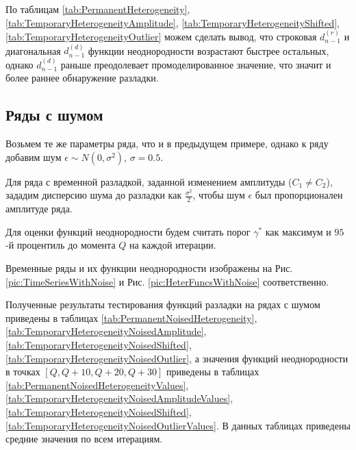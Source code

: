 \documentclass[specialist, substylefile = spbu.rtx,
			   subf, href, 12pt]{disser}
\begin{document}
По таблицам \ref{tab:PermanentHeterogeneity}, \ref{tab:TemporaryHeterogeneityAmplitude}, \ref{tab:TemporaryHeterogeneityShifted}, \ref{tab:TemporaryHeterogeneityOutlier} можем сделать вывод, что строковая $d_{n-1}^{(r)}$ и диагональная $d_{n-1}^{(d)}$ функции неоднородности возрастают быстрее остальных, однако $d_{n-1}^{(d)}$ раньше преодолевает промоделированное значение, что значит и более раннее обнаружение разладки.


\newpage
\subsection{Ряды с шумом}
Возьмем те же параметры ряда, что и в предыдущем примере, однако к ряду добавим шум $\epsilon \sim N(0, \sigma^2)$, $\sigma = 0.5$. 

Для ряда с временной разладкой, заданной изменением амплитуды ($C_1 \neq C_2$), зададим дисперсию шума до разладки как $\frac{\sigma^2}{2}$, чтобы шум $\epsilon$ был пропорционален амплитуде ряда. 

Для оценки функций неоднородности будем считать порог $ \gamma^* $ как максимум и $ 95 $-й процентиль до момента $ Q $ на каждой итерации.

Временные ряды и их функции неоднородности изображены на Рис. \ref{pic:TimeSeriesWithNoise} и Рис. \ref{pic:HeterFuncsWithNoise} соответственно.

Полученные результаты тестирования функций разладки на рядах с шумом приведены в таблицах \ref{tab:PermanentNoisedHeterogeneity}, \ref{tab:TemporaryHeterogeneityNoisedAmplitude}, \ref{tab:TemporaryHeterogeneityNoisedShifted}, \ref{tab:TemporaryHeterogeneityNoisedOutlier}, а значения функций неоднородности в точках $[Q, Q+10, Q+20, Q+30] $ приведены в таблицах \ref{tab:PermanentNoisedHeterogeneityValues}, \ref{tab:TemporaryHeterogeneityNoisedAmplitudeValues}, \ref{tab:TemporaryHeterogeneityNoisedShifted}, \ref{tab:TemporaryHeterogeneityNoisedOutlierValues}. В данных таблицах приведены средние значения по всем итерациям.
\end{document}
